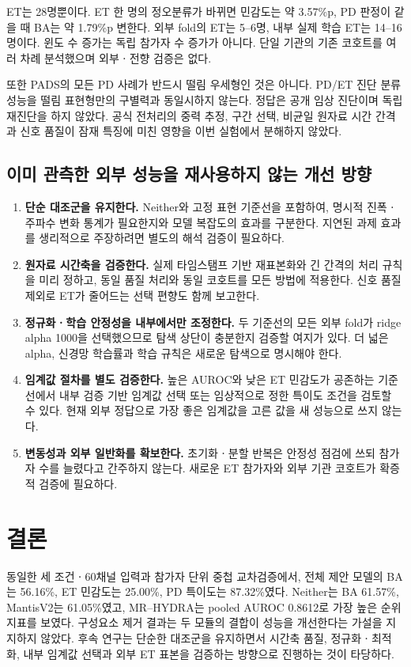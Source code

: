 \documentclass[11pt,a4paper]{article}
\numberwithin{equation}{section}
\begin{document}
ET는 28명뿐이다. ET 한 명의 정오분류가 바뀌면 민감도는 약 3.57\%p,
PD 판정이 같을 때 BA는 약 1.79\%p 변한다. 외부 fold의 ET는 5--6명,
내부 실제 학습 ET는 14--16명이다. 윈도 수 증가는 독립 참가자 수 증가가 아니다.
단일 기관의 기존 코호트를 여러 차례 분석했으며 외부ㆍ전향 검증은 없다.

또한 PADS의 모든 PD 사례가 반드시 떨림 우세형인 것은 아니다.
PD/ET 진단 분류 성능을 떨림 표현형만의 구별력과 동일시하지 않는다.
정답은 공개 임상 진단이며 독립 재진단을 하지 않았다.
공식 전처리의 중력 추정, 구간 선택, 비균일 원자료 시간 간격과 신호 품질이
잠재 특징에 미친 영향을 이번 실험에서 분해하지 않았다.

\subsection{이미 관측한 외부 성능을 재사용하지 않는 개선 방향}
\begin{enumerate}
 \item \textbf{단순 대조군을 유지한다.} Neither와 고정 표현 기준선을 포함하여,
 명시적 진폭ㆍ주파수 변화 통계가 필요한지와 모델 복잡도의 효과를 구분한다.
 지연된 과제 효과를 생리적으로 주장하려면 별도의 해석 검증이 필요하다.
 \item \textbf{원자료 시간축을 검증한다.} 실제 타임스탬프 기반 재표본화와 긴 간격의
 처리 규칙을 미리 정하고, 동일 품질 처리와 동일 코호트를 모든 방법에 적용한다.
 신호 품질 제외로 ET가 줄어드는 선택 편향도 함께 보고한다.
 \item \textbf{정규화ㆍ학습 안정성을 내부에서만 조정한다.} 두 기준선의 모든 외부
 fold가 ridge alpha 1000을 선택했으므로 탐색 상단이 충분한지 검증할 여지가 있다.
 더 넓은 alpha, 신경망 학습률과 학습 규칙은 새로운 탐색으로 명시해야 한다.
 \item \textbf{임계값 절차를 별도 검증한다.} 높은 AUROC와 낮은 ET 민감도가 공존하는
 기준선에서 내부 검증 기반 임계값 선택 또는 임상적으로 정한 특이도 조건을
 검토할 수 있다. 현재 외부 정답으로 가장 좋은 임계값을 고른 값을 새 성능으로 쓰지 않는다.
 \item \textbf{변동성과 외부 일반화를 확보한다.} 초기화ㆍ분할 반복은 안정성 점검에
 쓰되 참가자 수를 늘렸다고 간주하지 않는다. 새로운 ET 참가자와 외부 기관 코호트가
 확증적 검증에 필요하다.
\end{enumerate}

\section{결론}
동일한 세 조건ㆍ60채널 입력과 참가자 단위 중첩 교차검증에서,
전체 제안 모델의 BA는 56.16\%, ET 민감도는 25.00\%, PD 특이도는 87.32\%였다.
Neither는 BA 61.57\%, MantisV2는 61.05\%였고,
MR--HYDRA는 pooled AUROC 0.8612로 가장 높은 순위 지표를 보였다.
구성요소 제거 결과는 두 모듈의 결합이 성능을 개선한다는 가설을 지지하지 않았다.
후속 연구는 단순한 대조군을 유지하면서 시간축 품질, 정규화ㆍ최적화,
내부 임계값 선택과 외부 ET 표본을 검증하는 방향으로 진행하는 것이 타당하다.
\end{document}
